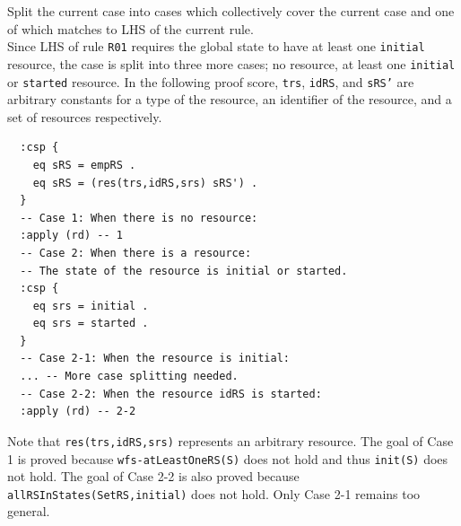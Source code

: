 \documentclass[12pt]{report}
\newcommand{\stt}[1]{{\small{\tt {#1}}}}
\begin{document}
 Split the current case into cases which
collectively cover the current case and one of which matches to LHS of
the current rule. \\
Since LHS of rule {\tt R01} requires the global state to have at least
one {\tt initial} resource, the case is split into three more cases;
no resource, at least one {\tt initial} or {\tt started} resource. In
the following proof score, {\tt trs}, {\tt idRS}, and {\tt sRS'} are
arbitrary constants for a type of the resource, an identifier of the
resource, and a set of resources respectively.
\small
\begin{verbatim}
  :csp { 
    eq sRS = empRS .
    eq sRS = (res(trs,idRS,srs) sRS') .
  }
  -- Case 1: When there is no resource:
  :apply (rd) -- 1
  -- Case 2: When there is a resource:
  -- The state of the resource is initial or started.
  :csp { 
    eq srs = initial .
    eq srs = started .
  }
  -- Case 2-1: When the resource is initial:
  ... -- More case splitting needed.
  -- Case 2-2: When the resource idRS is started:
  :apply (rd) -- 2-2
\end{verbatim}
\normalsize
Note that \stt{res(trs,idRS,srs)} represents an arbitrary resource.
The goal of Case 1 is proved because \stt{wfs-atLeastOneRS(S)} does
not hold and thus \stt{init(S)} does not hold. The goal of Case 2-2 is
also proved because \stt{allRSInStates(SetRS,initial)} does not hold.
Only Case 2-1 remains too general.\\
\end{document}
